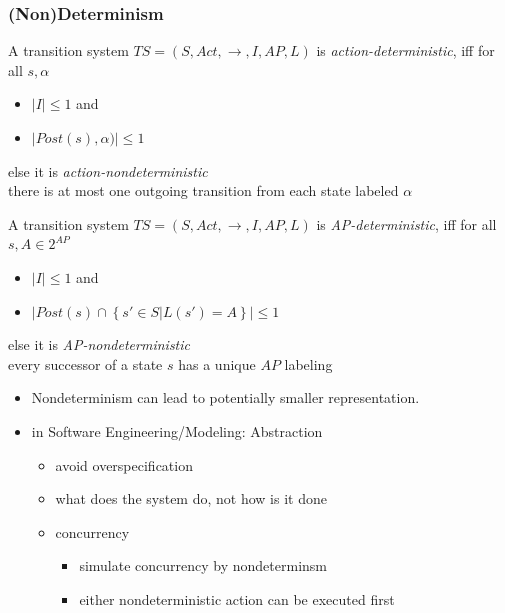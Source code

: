 \documentclass[a4paper, 10pt]{article}
\begin{document}
\subsubsection{(Non)Determinism}
\begin{shaded}
    A transition system $TS=\left(S,Act,\to,I,AP,L\right)$ is \emph{action-deterministic}, iff for all $s,\alpha$
    \begin{itemize}
        \item $|I|\leq1$ and
        \item $|Post(s),\alpha)|\leq1$
    \end{itemize}
    else it is \emph{action-nondeterministic} \\
    {\tiny there is at most one outgoing transition from each state labeled $\alpha$}
\end{shaded}

\begin{shaded}
    A transition system $TS=\left(S,Act,\to,I,AP,L\right)$ is \emph{AP-deterministic}, iff for all $s,A\in2^{AP}$
    \begin{itemize}
        \item $|I|\leq1$ and
        \item $|Post(s)\cap \left\{s'\in S | L(s')=A\right\}|\leq1$
    \end{itemize}
    else it is \emph{AP-nondeterministic} \\
    {\tiny every successor of a state $s$ has a unique $AP$ labeling}
\end{shaded}

\begin{itemize}
    \item Nondeterminism can lead to potentially smaller representation.
    \item in Software Engineering/Modeling: Abstraction
    \begin{itemize}
        \item avoid overspecification
        \item what does the system do, not how is it done
    \end{itemize}
    \begin{itemize}
        \item concurrency
        \begin{itemize}
            \item simulate concurrency by nondeterminsm
            \item either nondeterministic action can be executed first
        \end{itemize}
    \end{itemize}
\end{itemize}
\end{document}
